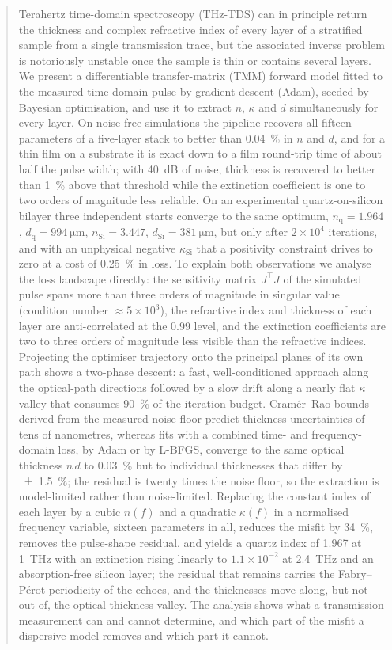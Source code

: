 \documentclass{optica-article}
\newcommand{\kap}{\kappa}
\begin{document}
\begin{abstract}
Terahertz time-domain spectroscopy (THz-TDS) can in principle return the thickness and complex refractive index of every layer of a stratified sample from a single transmission trace, but the associated inverse problem is notoriously unstable once the sample is thin or contains several layers. We present a differentiable transfer-matrix (TMM) forward model fitted to the measured time-domain pulse by gradient descent (Adam), seeded by Bayesian optimisation, and use it to extract $n$, $\kap$ and $d$ simultaneously for every layer. On noise-free simulations the pipeline recovers all fifteen parameters of a five-layer stack to better than \SI{0.04}{\percent} in $n$ and $d$, and for a thin film on a substrate it is exact down to a film round-trip time of about half the pulse width; with \SI{40}{dB} of noise, thickness is recovered to better than \SI{1}{\percent} above that threshold while the extinction coefficient is one to two orders of magnitude less reliable. On an experimental quartz-on-silicon bilayer three independent starts converge to the same optimum, $n_{\mathrm{q}}=1.964$, $d_{\mathrm{q}}=\SI{994}{\micro\metre}$, $n_{\mathrm{Si}}=3.447$, $d_{\mathrm{Si}}=\SI{381}{\micro\metre}$, but only after $2\times10^4$ iterations, and with an unphysical negative $\kap_{\mathrm{Si}}$ that a positivity constraint drives to zero at a cost of \SI{0.25}{\percent} in loss. To explain both observations we analyse the loss landscape directly: the sensitivity matrix $J^\top J$ of the simulated pulse spans more than three orders of magnitude in singular value (condition number $\approx 5\times10^3$), the refractive index and thickness of each layer are anti-correlated at the \num{0.99} level, and the extinction coefficients are two to three orders of magnitude less visible than the refractive indices. Projecting the optimiser trajectory onto the principal planes of its own path shows a two-phase descent: a fast, well-conditioned approach along the optical-path directions followed by a slow drift along a nearly flat $\kap$ valley that consumes \SI{90}{\percent} of the iteration budget. Cram\'er--Rao bounds derived from the measured noise floor predict thickness uncertainties of tens of nanometres, whereas fits with a combined time- and frequency-domain loss, by Adam or by L-BFGS, converge to the same optical thickness $n\,d$ to \SI{0.03}{\percent} but to individual thicknesses that differ by \SI{\pm1.5}{\percent}; the residual is twenty times the noise floor, so the extraction is model-limited rather than noise-limited. Replacing the constant index of each layer by a cubic $n(f)$ and a quadratic $\kap(f)$ in a normalised frequency variable, sixteen parameters in all, reduces the misfit by \SI{34}{\percent}, removes the pulse-shape residual, and yields a quartz index of 1.967 at \SI{1}{THz} with an extinction rising linearly to $1.1\times10^{-2}$ at \SI{2.4}{THz} and an absorption-free silicon layer; the residual that remains carries the Fabry--P\'erot periodicity of the echoes, and the thicknesses move along, but not out of, the optical-thickness valley. The analysis shows what a transmission measurement can and cannot determine, and which part of the misfit a dispersive model removes and which part it cannot.

\end{abstract}
\end{document}
